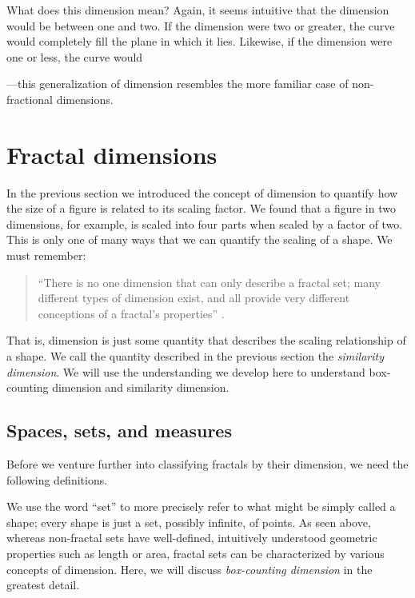 \begin{myremark}What does this dimension mean? Again, it seems intuitive that the dimension would be between one and two. If the dimension were two or greater, the curve would completely fill the plane in which it lies. Likewise, if the dimension were one or less, the curve would 


---this generalization of dimension resembles the more familiar case of non-fractional dimensions. \end{myremark}

\section{Fractal dimensions}
In the previous section we introduced the concept of dimension to quantify how the size of a figure is related to its scaling factor. We found that a figure in two dimensions, for example, is scaled into four parts when scaled by a factor of two. This is only one of many ways that we can quantify the scaling of a shape. We must remember:

\begin{quote}
``There is no one dimension that can only describe a fractal set; many different types of dimension exist, and all provide very different conceptions of a fractal's properties'' \citep{fractaltextbook}.
\end{quote}

That is, dimension is just some quantity that describes the scaling relationship of a shape. We call the quantity described in the previous section the \emph{similarity dimension}. We will use the understanding we develop here to understand box-counting dimension and similarity dimension.

\subsection{Spaces, sets, and measures}
Before we venture further into classifying fractals by their dimension, we need the following definitions.

We use the word ``set'' to more precisely refer to what might be simply called a shape; every shape is just a set, possibly infinite, of points. As seen above, whereas non-fractal sets have well-defined, intuitively understood geometric properties such as length or area, fractal sets can be characterized by various concepts of dimension. Here, we will discuss \textit{box-counting dimension} in the greatest detail.



